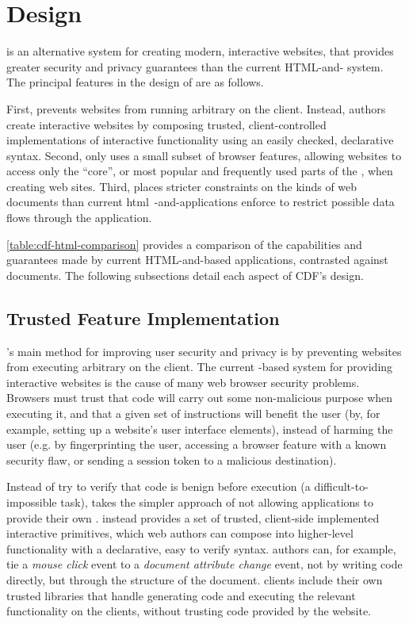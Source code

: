\section{Design}
\label{future-web:design}

\CDF is an alternative system for creating modern, interactive websites, that
provides greater security and privacy guarantees than the current HTML-and-\JS
system.  The principal features in the design of \CDF are as follows.

First, \CDF prevents websites from running arbitrary \JS on the
client.  Instead, \CDF authors create interactive websites by composing
trusted, client-controlled implementations of interactive functionality using
an easily checked, declarative syntax.  Second, \CDF only uses a small
subset of browser features, allowing websites to access only the ``core'', or
most popular and frequently used parts of the \WAPI, when creating web sites.
Third, \CDF places stricter constraints on the kinds of web documents
than current \gls{html}~-and-\JS applications enforce to restrict possible data
flows through the application.



\ref{table:cdf-html-comparison} provides a comparison of the capabilities
and guarantees made by current HTML-and-\JS based applications, contrasted
against \CDF documents.  The following subsections detail
each aspect of CDF's design.


\subsection{Trusted Feature Implementation}
\label{future-web:design:trusted-feature-implementation}
\CDF's main method for improving user security and privacy is by preventing
websites from executing arbitrary \JS on the client.  The current \JS-based
system for providing interactive websites is the cause of many web browser
security problems.  Browsers must trust that code will carry out some
non-malicious purpose when executing it, and that a given set of \JS
instructions will benefit the user (by, for example, setting up a website's
user interface elements), instead of harming the user (e.g. by fingerprinting
the user, accessing a browser feature with a known security flaw, or sending a
session token to a malicious destination).

Instead of try to verify that \JS code is benign before execution (a
difficult-to-impossible task), \CDF takes the simpler approach of not allowing
applications to provide their own \JS.  \CDF instead provides a set of trusted,
client-side implemented interactive primitives, which web authors can compose
into higher-level functionality with a declarative, easy to verify syntax.
\CDF authors can, for example, tie a \emph{mouse click} event to a
\emph{document attribute change} event, not by writing code directly, but
through the structure of the document.  \CDF clients include their own trusted
libraries that handle generating code and executing the relevant functionality
on the clients, without trusting code provided by the website.

